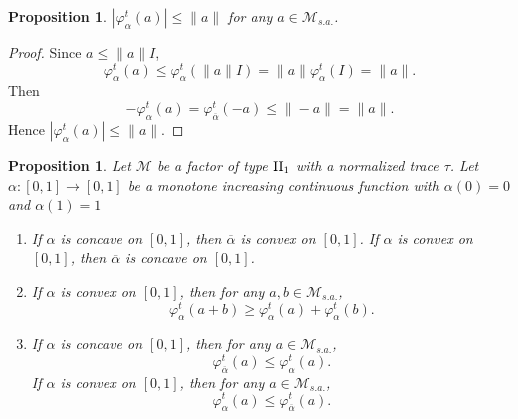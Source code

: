 \documentclass[a4paper,12pt]{amsart}
\newtheorem{proposition}[definition]{Proposition}
\newcommand{\M}{\mathcal{M}}
\begin{document}
\begin{proposition}
$|\varphi_{\alpha}^{t}(a)| \leq \|a\|$  for any $a \in  \M_{s.a.}$.
\end{proposition}
\begin{proof}
Since $a \leq \|a\|I$, 
$$
\varphi_{\alpha}^{t}(a)\leq  \varphi_{\alpha}^{t}(\|a\|I) = \|a\|\varphi_{\alpha}^{t}(I) =  \|a\|. 
$$
Then
$$
- \varphi_{\alpha}^{t}(a) = \varphi_{\overline{\alpha}}^{t}(-a) \leq \|-a\| = \|a\|. 
$$
Hence $|\varphi_{\alpha}^{t}(a)| \leq \|a\|$. 
\end{proof}


\begin{proposition} \label{superadditivity}
Let $\M$ be a factor of type ${\rm II}_1$ with a normalized trace $\tau$.  
Let $\alpha: [0,1]  \rightarrow [0, 1]$ be a 
monotone increasing continuous function with $\alpha(0) = 0$ and $\alpha(1) = 1$ 
\begin{enumerate}
\item[$(1)$] 
If $\alpha$ is concave on $[0,1]$, then $\overline{\alpha}$ is convex on $[0,1]$. 
If $\alpha$ is convex on $[0,1]$, then $\overline{\alpha}$ is concave on $[0,1]$. 
\item[$(2)$] 
If $\alpha$ is convex on $[0,1]$, then for any $a, b \in {\M}_{s.a.}$, 
\[  
\varphi_{\alpha}^{t}(a + b) \geq \varphi_{\alpha}^{t}(a) + \varphi_{\alpha}^{t}(b).
 \]
\item[$(3)$] 
If $\alpha$ is concave on $[0,1]$, then  for any $a \in {\M}_{s.a.}$,
\[ 
\varphi_{\overline{\alpha}}^{t}(a)  \leq \varphi_{\alpha}^{t}(a).
\]
If $\alpha$ is convex on $[0,1]$, then  for any $a \in {\M}_{s.a.}$,
\[
\varphi_{\alpha}^{t}(a) \leq \varphi_{\overline{\alpha}}^{t}(a). 
\]
\end{enumerate}
\end{proposition}
\end{document}

